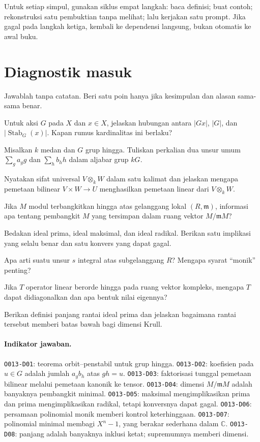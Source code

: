 \documentclass[11pt,a4paper]{article}
\newcommand{\oid}[1]{\texttt{#1}}
\begin{document}
Untuk setiap simpul, gunakan siklus empat langkah: baca definisi; buat contoh;
rekonstruksi satu pembuktian tanpa melihat; lalu kerjakan satu prompt. Jika
gagal pada langkah ketiga, kembali ke dependensi langsung, bukan otomatis ke
awal buku.

\section{Diagnostik masuk}

Jawablah tanpa catatan. Beri satu poin hanya jika kesimpulan dan alasan sama-sama
benar.

\begin{description}[leftmargin=3.2cm,style=nextline]
\item[\oid{O013-D01}] Untuk aksi $G$ pada $X$ dan $x\in X$, jelaskan hubungan antara
$|Gx|$, $|G|$, dan $|\operatorname{Stab}_G(x)|$. Kapan rumus kardinalitas ini
berlaku?
\item[\oid{O013-D02}] Misalkan $k$ medan dan $G$ grup hingga. Tuliskan perkalian dua unsur
umum $\sum_g a_g g$ dan $\sum_h b_h h$ dalam aljabar grup $kG$.
\item[\oid{O013-D03}] Nyatakan sifat universal $V\otimes_k W$ dalam satu kalimat dan jelaskan
mengapa pemetaan bilinear $V\times W\to U$ menghasilkan pemetaan linear dari
$V\otimes_k W$.
\item[\oid{O013-D04}] Jika $M$ modul terbangkitkan hingga atas gelanggang lokal $(R,\mathfrak
m)$, informasi apa tentang pembangkit $M$ yang tersimpan dalam ruang vektor
$M/\mathfrak mM$?
\item[\oid{O013-D05}] Bedakan ideal prima, ideal maksimal, dan ideal radikal. Berikan satu
implikasi yang selalu benar dan satu konvers yang dapat gagal.
\item[\oid{O013-D06}] Apa arti suatu unsur $s$ integral atas subgelanggang $R$? Mengapa syarat
``monik'' penting?
\item[\oid{O013-D07}] Jika $T$ operator linear berorde hingga pada ruang vektor kompleks,
mengapa $T$ dapat didiagonalkan dan apa bentuk nilai eigennya?
\item[\oid{O013-D08}] Berikan definisi panjang rantai ideal prima dan jelaskan bagaimana rantai
tersebut memberi batas bawah bagi dimensi Krull.
\end{description}

\paragraph{Indikator jawaban.}
\oid{O013-D01}: teorema orbit--penstabil untuk grup hingga.
\oid{O013-D02}: koefisien pada $u\in G$ adalah jumlah $a_gb_h$ atas
$gh=u$. \oid{O013-D03}: faktorisasi tunggal pemetaan bilinear melalui pemetaan
kanonik ke tensor. \oid{O013-D04}: dimensi $M/\mathfrak mM$ adalah banyaknya
pembangkit minimal. \oid{O013-D05}: maksimal mengimplikasikan prima dan prima
mengimplikasikan radikal, tetapi konversnya dapat gagal. \oid{O013-D06}:
persamaan polinomial monik memberi kontrol keterhinggaan. \oid{O013-D07}:
polinomial minimal membagi $X^n-1$, yang berakar sederhana dalam
$\mathbb C$. \oid{O013-D08}: panjang adalah banyaknya inklusi ketat; supremumnya
memberi dimensi.
\end{document}
